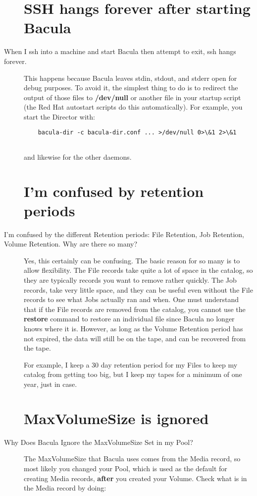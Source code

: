 \begin{description}
\label{sshHanging}
\section{SSH hangs forever after starting Bacula}
\item [When I ssh into a machine and start Bacula then attempt to exit, 
   ssh hangs forever.]
   This happens because Bacula leaves stdin, stdout, and stderr open for
   debug purposes.  To avoid it, the simplest thing to do is to redirect
   the output of those files to {\bf /dev/null} or another file in your
   startup script (the Red Hat autostart scripts do this automatically).
   For example, you start the Director with:
   
\footnotesize
\begin{verbatim}
    bacula-dir -c bacula-dir.conf ... >/dev/null 0>\&1 2>\&1
    
\end{verbatim}
\normalsize

and likewise for the other daemons.  

\label{RetentionPeriods}
\section{I'm confused by retention periods}
\item [I'm confused by the different Retention periods: File Retention, 
   Job Retention, Volume Retention. Why are there so many?]
   Yes, this certainly can be confusing.  The basic reason for so many is
   to allow flexibility.  The File records take quite a lot of space in the
   catalog, so they are typically records you want to remove rather
   quickly.  The Job records, take very little space, and they can be
   useful even without the File records to see what Jobs actually ran and
   when.  One must understand that if the File records are removed from the
   catalog, you cannot use the {\bf restore} command to restore an
   individual file since Bacula no longer knows where it is.  However, as
   long as the Volume Retention period has not expired, the data will still
   be on the tape, and can be recovered from the tape.
   
   For example, I keep a 30 day retention period for my Files to keep my
   catalog from getting too big, but I keep my tapes for a minimum of one
   year, just in case.

\label{MaxVolumeSize}
\section{MaxVolumeSize is ignored}
\item [Why Does Bacula Ignore the MaxVolumeSize Set in my Pool?]
   The MaxVolumeSize that Bacula uses comes from the Media record, so most
   likely you changed your Pool, which is used as the default for creating
   Media records, {\bf after} you created your Volume.  Check what is in
   the Media record by doing:


\end{description}
